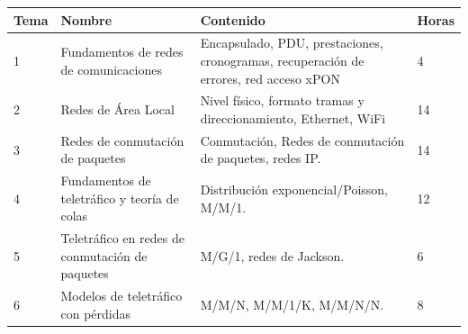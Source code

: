\documentclass[xcolor=table,xcolor=x11names]{beamer}
\begin{document}
\begin{frame}{\subsecname}
    \begin{table}
        \centering
        \small
        \begin{tabular}{p{.7cm} | p{3.5cm} | p{4.75cm} | p{.8cm} }
            \toprule
            \textbf{Tema} & \textbf{Nombre} & \textbf{Contenido} & \textbf{Horas} \\ \midrule
            \rowcolor{upmblue!20} 1 &  Fundamentos de redes de comunicaciones & Encapsulado, PDU, prestaciones, cronogramas,
            recuperación de errores, red acceso xPON & 4\\
            2 &  Redes de Área Local & Nivel físico, formato tramas y direccionamiento, Ethernet, WiFi & 14\\
            \rowcolor{upmblue!20}3 & Redes de conmutación de paquetes  & Conmutación, Redes de conmutación de paquetes, redes IP. & 14\\
            4 &  Fundamentos de teletráfico y teoría de colas
              & Distribución exponencial/Poisson, M/M/1. & 12\\
            \rowcolor{upmblue!20}5 &  Teletráfico en redes de conmutación de paquetes & M/G/1, redes de Jackson. & 6 \\ 
            6 &   Modelos de teletráfico con pérdidas
              & M/M/N, M/M/1/K, M/M/N/N. & 8 \\ \bottomrule
        \end{tabular}
    \end{table}
\end{frame}
\end{document}
